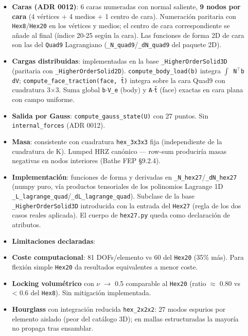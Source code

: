 \documentclass[11pt,letterpaper,oneside]{report}
\begin{document}
\begin{itemize}
  \item \textbf{Caras (ADR 0012)}: 6 caras numeradas con normal saliente, \textbf{9 nodos por cara} (4 vértices + 4 medios + 1 centro de cara). Numeración paritaria con \texttt{Hex8}/\texttt{Hex20} en los vértices y medios; el centro de cara correspondiente se añade al final (índice 20-25 según la cara). Las funciones de forma 2D de cara son las del \texttt{Quad9} Lagrangiano (\texttt{\_N\_quad9}/\texttt{\_dN\_quad9} del paquete 2D).
  \item \textbf{Cargas distribuidas}: implementadas en la base \texttt{\_HigherOrderSolid3D} (paritaria con \texttt{\_HigherOrderSolid2D}). \texttt{compute\_body\_load(b)} integra \texttt{\ensuremath{\int} N\ensuremath{^{\top}}b dV}; \texttt{compute\_face\_traction(face, t̄)} integra sobre la cara Quad9 con cuadratura 3\ensuremath{\times}3. Suma global \texttt{b\ensuremath{\cdot}V\_e} (body) y \texttt{A\ensuremath{\cdot}t̄} (face) exactas en cara plana con campo uniforme.
  \item \textbf{Salida por Gauss}: \texttt{compute\_gauss\_state(U)} con 27 puntos. Sin \texttt{internal\_forces} (ADR 0012).
  \item \textbf{Masa}: consistente con cuadratura \texttt{hex\_3x3x3} fija (independiente de la cuadratura de K). Lumped HRZ canónico --- row-sum produciría masas negativas en nodos interiores (Bathe FEP §9.2.4).
  \item \textbf{Implementación}: funciones de forma y derivadas en \texttt{\_N\_hex27}/\texttt{\_dN\_hex27} (numpy puro, vía productos tensoriales de los polinomios Lagrange 1D \texttt{\_L\_lagrange\_quad}/\texttt{\_dL\_lagrange\_quad}). Subclase de la base \texttt{\_HigherOrderSolid3D} introducida con la entrada del \texttt{Hex27} (regla de los dos casos reales aplicada). El cuerpo de \texttt{hex27.py} queda como declaración de atributos.
  \item \textbf{Limitaciones declaradas}:
  \item \textbf{Coste computacional}: 81 DOFs/elemento vs 60 del \texttt{Hex20} (35\% más). Para flexión simple \texttt{Hex20} da resultados equivalentes a menor coste.
  \item \textbf{Locking volumétrico} con \ensuremath{\nu} \ensuremath{\to} 0.5 comparable al \texttt{Hex20} (ratio \ensuremath{\approx} 0.80 vs < 0.6 del \texttt{Hex8}). Sin mitigación implementada.
  \item \textbf{Hourglass} con integración reducida \texttt{hex\_2x2x2}: 27 modos espurios por elemento aislado (peor del catálogo 3D); en mallas estructuradas la mayoría no propaga tras ensamblar.

\end{itemize}
\end{document}
